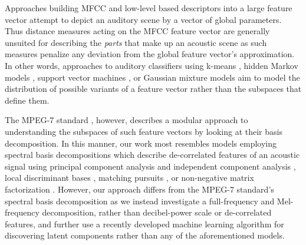 \documentclass[a4paper,10pt,final]{ThesisStyle}
\begin{document}



Approaches building MFCC and low-level based descriptors into a large feature vector attempt to depict an auditory scene by a vector of global parameters. Thus distance measures acting on the MFCC feature vector are generally unsuited for describing the \textit{parts} that make up an acoustic scene as such measures penalize any deviation from the global feature vector's approximation.  In other words, approaches to auditory classifiers using k-means \cite{Harma2005,Eronen2006,Allamanche2001}, hidden Markov models \cite{Eronen2006,Mesaros2010}, support vector machines \cite{Guo2003a}, or Gaussian mixture models \cite{Wang2011,Aucouturier2007a,Pampalk2006a} aim to model the distribution of possible variants of a feature vector rather than the subspaces that define them.  

The MPEG-7 standard \cite{Casey2001a,Manjunath2002}, however, describes a modular approach to understanding the subspaces of such feature vectors by looking at their basis decomposition.  In this manner, our work most resembles models employing spectral basis decompositions which describe de-correlated features of an acoustic signal using principal component analysis and independent component analysis \cite{Casey2001a,Xiong2003,Kim2004}, local discriminant bases \cite{Su2011}, matching pursuits \cite{Chu2009a}, or non-negative matrix factorization \cite{Raj2010}.  However, our approach differs from the MPEG-7 standard's spectral basis decomposition \cite{Casey2001a} as we instead investigate a full-frequency and Mel-frequency decomposition, rather than decibel-power scale or de-correlated features, and further use a recently developed machine learning algorithm for discovering latent components rather than any of the aforementioned models.
\end{document}
